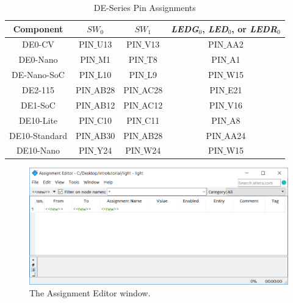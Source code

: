 \documentclass[11pt, twoside, pdftex]{article}
\begin{document}
\begin{table}[H]
\centering
\begin{tabular}{| c | c | c | c |}
\hline
Component & $SW_0$ & $SW_1$ & {\it LEDG}$_0$, {\it LED}$_0$, or {\it LEDR}$_0$ \\
\hline
DE0-CV & PIN$\_$U13 & PIN$\_$V13 & PIN$\_$AA2 \\
\hline
DE0-Nano & PIN$\_$M1 & PIN$\_$T8 & PIN$\_$A1 \\
\hline
DE-Nano-SoC & PIN$\_$L10 & PIN$\_$L9 & PIN$\_$W15 \\
\hline
DE2-115 & PIN$\_$AB28 & PIN$\_$AC28 & PIN$\_$E21 \\
\hline
DE1-SoC & PIN$\_$AB12 & PIN$\_$AC12 & PIN$\_$V16 \\
\hline
DE10-Lite & PIN$\_$C10 & PIN$\_$C11 & PIN$\_$A8 \\
\hline
DE10-Standard & PIN$\_$AB30 & PIN$\_$AB28 & PIN$\_$AA24 \\
\hline
DE10-Nano & PIN$\_$Y24 & PIN$\_$W24 & PIN$\_$W15 \\
\hline
\end{tabular}

\caption{DE-Series Pin Assignments}
\label{tab:pinassign}
\end{table}\begin{figure}[H]
   \begin{center}
      \includegraphics[scale=0.65]{figures/figure24.png}
   \caption{The Assignment Editor window.} 
	 \label{fig:24}
	 \end{center}
\end{figure}
\end{document}
